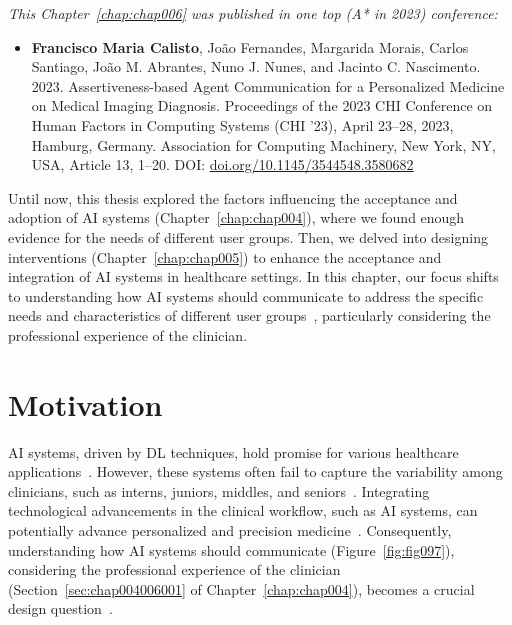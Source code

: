 \clearpage
\label{chap:chap006}

\noindent
{\it This Chapter~\ref{chap:chap006} was published in one top (A* in 2023) conference:}

\vspace{0.5mm}

\begin{itemize}
\item {\bf Francisco Maria Calisto}, Jo\~{a}o Fernandes, Margarida Morais, Carlos Santiago, Jo\~{a}o M. Abrantes, Nuno J. Nunes, and Jacinto C. Nascimento. 2023. Assertiveness-based Agent Communication for a Personalized Medicine on Medical Imaging Diagnosis. Proceedings of the 2023 CHI Conference on Human Factors in Computing Systems (CHI '23), April 23--28, 2023, Hamburg, Germany. Association for Computing Machinery, New York, NY, USA, Article 13, 1–20. DOI: \href{https://doi.org/10.1145/3544548.3580682}{doi.org/10.1145/3544548.3580682}
\end{itemize}

Until now, this thesis explored the factors influencing the acceptance and adoption of \ac{AI} systems (Chapter~\ref{chap:chap004}), where we found enough evidence for the needs of different user groups.
Then, we delved into designing interventions (Chapter~\ref{chap:chap005}) to enhance the acceptance and integration of \ac{AI} systems in healthcare settings.
In this chapter, our focus shifts to understanding how \ac{AI} systems should communicate to address the specific needs and characteristics of different user groups~\cite{10.1145/3544548.3580682}, particularly considering the professional experience of the clinician.

\section{Motivation}
\label{sec:chap006001}

\ac{AI} systems, driven by \ac{DL} techniques, hold promise for various healthcare applications~\cite{CALISTO2022102285, Hannun2019, Ruamviboonsuk2019, Stephansen2018}.
However, these systems often fail to capture the variability among clinicians, such as interns, juniors, middles, and seniors~\cite{Uddin2019}.
Integrating technological advancements in the clinical workflow, such as \ac{AI} systems, can potentially advance personalized and precision medicine~\cite{Subramanian2020, HO2020497, Wetzstein2020}.
Consequently, understanding how \ac{AI} systems should communicate (Figure~\ref{fig:fig097}), considering the professional experience of the clinician (Section~\ref{sec:chap004006001} of Chapter~\ref{chap:chap004}), becomes a crucial design question~\cite{pacheco2019alignment}.

